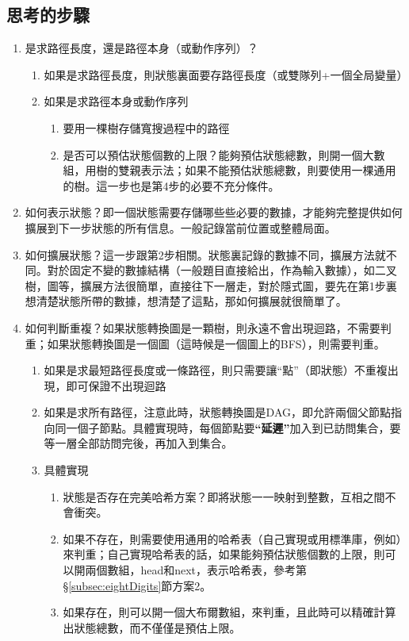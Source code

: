 \subsection{思考的步驟}
\begin{enumerate}
\item 是求路徑長度，還是路徑本身（或動作序列）？
    \begin{enumerate}
    \item 如果是求路徑長度，則狀態裏面要存路徑長度（或雙隊列+一個全局變量）
    \item 如果是求路徑本身或動作序列
        \begin{enumerate}
            \item 要用一棵樹存儲寬搜過程中的路徑
            \item 是否可以預估狀態個數的上限？能夠預估狀態總數，則開一個大數組，用樹的雙親表示法；如果不能預估狀態總數，則要使用一棵通用的樹。這一步也是第4步的必要不充分條件。
        \end{enumerate}
    \end{enumerate}

\item 如何表示狀態？即一個狀態需要存儲哪些些必要的數據，才能夠完整提供如何擴展到下一步狀態的所有信息。一般記錄當前位置或整體局面。

\item 如何擴展狀態？這一步跟第2步相關。狀態裏記錄的數據不同，擴展方法就不同。對於固定不變的數據結構（一般題目直接給出，作為輸入數據），如二叉樹，圖等，擴展方法很簡單，直接往下一層走，對於隱式圖，要先在第1步裏想清楚狀態所帶的數據，想清楚了這點，那如何擴展就很簡單了。

\item 如何判斷重複？如果狀態轉換圖是一顆樹，則永遠不會出現迴路，不需要判重；如果狀態轉換圖是一個圖（這時候是一個圖上的BFS），則需要判重。
    \begin{enumerate}
    \item 如果是求最短路徑長度或一條路徑，則只需要讓“點”（即狀態）不重複出現，即可保證不出現迴路
    \item 如果是求所有路徑，注意此時，狀態轉換圖是DAG，即允許兩個父節點指向同一個子節點。具體實現時，每個節點要\textbf{“延遲”}加入到已訪問集合，要等一層全部訪問完後，再加入到集合。
    \item 具體實現
        \begin{enumerate}
        \item 狀態是否存在完美哈希方案？即將狀態一一映射到整數，互相之間不會衝突。
        \item 如果不存在，則需要使用通用的哈希表（自己實現或用標準庫，例如）來判重；自己實現哈希表的話，如果能夠預估狀態個數的上限，則可以開兩個數組，head和next，表示哈希表，參考第 \S \ref{subsec:eightDigits}節方案2。
        \item 如果存在，則可以開一個大布爾數組，來判重，且此時可以精確計算出狀態總數，而不僅僅是預估上限。
        \end{enumerate}
    \end{enumerate}


\end{enumerate}
